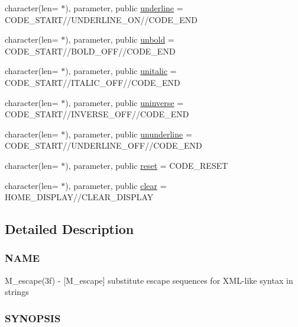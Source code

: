 \begin{DoxyCompactItemize}
\item 
character(len= $\ast$), parameter, public \mbox{\hyperlink{namespacem__escape_acee3a3082a12ed884ef99019d0f30f86}{underline}} = C\+O\+D\+E\+\_\+\+S\+T\+A\+RT//U\+N\+D\+E\+R\+L\+I\+N\+E\+\_\+\+ON//C\+O\+D\+E\+\_\+\+E\+ND
\item 
character(len= $\ast$), parameter, public \mbox{\hyperlink{namespacem__escape_aaa2404c29a0f5840417e71a8219a118c}{unbold}} = C\+O\+D\+E\+\_\+\+S\+T\+A\+RT//B\+O\+L\+D\+\_\+\+O\+FF//C\+O\+D\+E\+\_\+\+E\+ND
\item 
character(len= $\ast$), parameter, public \mbox{\hyperlink{namespacem__escape_a6b95826bb2793069e7fa8f8386bdb520}{unitalic}} = C\+O\+D\+E\+\_\+\+S\+T\+A\+RT//I\+T\+A\+L\+I\+C\+\_\+\+O\+FF//C\+O\+D\+E\+\_\+\+E\+ND
\item 
character(len= $\ast$), parameter, public \mbox{\hyperlink{namespacem__escape_a067207898e3ef5118bc1cad83f40dad8}{uninverse}} = C\+O\+D\+E\+\_\+\+S\+T\+A\+RT//I\+N\+V\+E\+R\+S\+E\+\_\+\+O\+FF//C\+O\+D\+E\+\_\+\+E\+ND
\item 
character(len= $\ast$), parameter, public \mbox{\hyperlink{namespacem__escape_adbaa599772d5df6567d75188ac3258bf}{ununderline}} = C\+O\+D\+E\+\_\+\+S\+T\+A\+RT//U\+N\+D\+E\+R\+L\+I\+N\+E\+\_\+\+O\+FF//C\+O\+D\+E\+\_\+\+E\+ND
\item 
character(len= $\ast$), parameter, public \mbox{\hyperlink{namespacem__escape_ae02be34bb084db8024b234bc87058d3a}{reset}} = C\+O\+D\+E\+\_\+\+R\+E\+S\+ET
\item 
character(len= $\ast$), parameter, public \mbox{\hyperlink{namespacem__escape_a49210f3a0332fb37df08c519b3252bef}{clear}} = H\+O\+M\+E\+\_\+\+D\+I\+S\+P\+L\+AY//C\+L\+E\+A\+R\+\_\+\+D\+I\+S\+P\+L\+AY
\end{DoxyCompactItemize}


\subsection{Detailed Description}
\subsubsection*{N\+A\+ME}

M\+\_\+escape(3f) -\/ \mbox{[}M\+\_\+escape\mbox{]} substitute escape sequences for X\+M\+L-\/like syntax in strings 

\subsubsection*{S\+Y\+N\+O\+P\+S\+IS}

